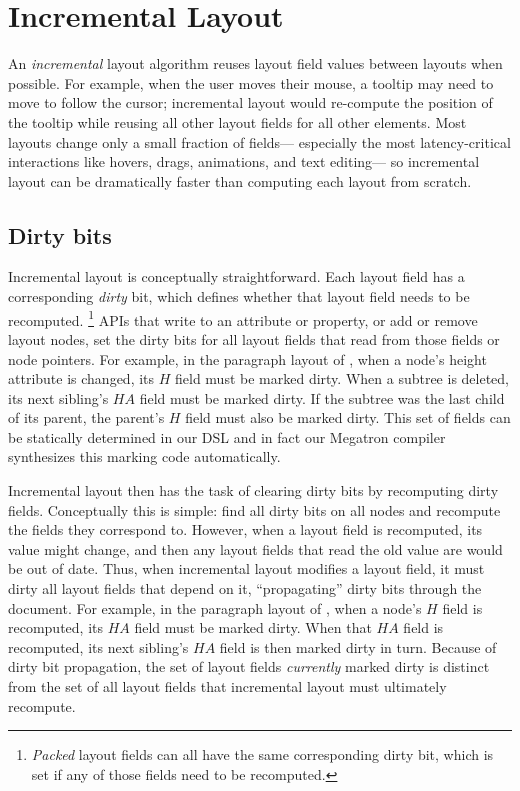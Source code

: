 \section{Incremental Layout}

An \emph{incremental} layout algorithm
  reuses layout field values between layouts when possible.
For example, when the user moves their mouse,
  a tooltip may need to move to follow the cursor;
  incremental layout would re-compute the position of the tooltip
  while reusing all other layout fields for all other elements.
Most layouts change only a small fraction of fields---%
  especially the most latency-critical interactions
  like hovers, drags, animations, and text editing---%
  so incremental layout can be dramatically faster
  than computing each layout from scratch.

\subsection{Dirty bits}
\label{sec:recompute-phase}

Incremental layout is conceptually straightforward. 
Each layout field has a corresponding \textit{dirty} bit,
  which defines whether that layout field needs to be recomputed.%
\footnote{\emph{Packed} layout fields can all have
  the same corresponding dirty bit,
  which is set if any of those fields need to be recomputed.}
APIs that write to an attribute or property,
  or add or remove layout nodes,
  set the dirty bits for all layout fields
  that read from those fields or node pointers.
For example,
  in the paragraph layout of ,
  when a node's \textsf{height} attribute is changed,
  its $H$ field must be marked dirty.
When a subtree is deleted,
  its next sibling's $HA$ field must be marked dirty.
If the subtree was the last child of its parent,
  the parent's $H$ field must also be marked dirty.
This set of fields can be statically determined in our DSL
  and in fact our Megatron compiler synthesizes
  this marking code automatically.

Incremental layout then has the task of clearing dirty bits
  by recomputing dirty fields.
Conceptually this is simple:
  find all dirty bits on all nodes and recompute
  the fields they correspond to.
However, when a layout field is recomputed,
  its value might change,
  and then any layout fields that read the old value
  are would be out of date.
Thus, when incremental layout modifies a layout field,
  it must dirty all layout fields that depend on it,
  ``propagating'' dirty bits through the document.
For example,
  in the paragraph layout of ,
  when a node's $H$ field is recomputed,
  its $HA$ field must be marked dirty.
When that $HA$ field is recomputed,
  its next sibling's $HA$ field is then marked dirty in turn.
Because of dirty bit propagation,
  the set of layout fields \emph{currently} marked dirty
  is distinct from the set of all layout fields
  that incremental layout must ultimately recompute.

